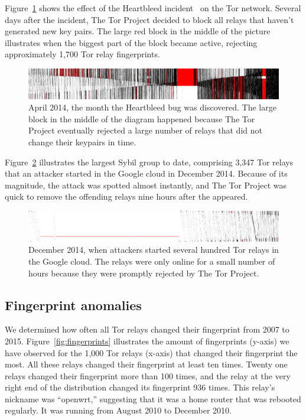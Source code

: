 Figure~\ref{fig:2014-04-heartbleed} shows the effect of the Heartbleed
incident~\cite{Durumeric2014a} on the Tor network.  Several days after the
incident, The Tor Project decided to block all relays that haven't generated new
key pairs.  The large red block in the middle of the picture illustrates when
the biggest part of the block became active, rejecting approximately 1,700 Tor
relay fingerprints.

\begin{figure}[t]
	\centering
	\includegraphics[width=\linewidth]{diagrams/heartbleed-uptimes.jpg}
	\caption{April 2014, the month the Heartbleed bug was discovered.
		The large block in the middle of the diagram happened because The
		Tor Project eventually rejected a large number of relays that did not
		change their keypairs in time.}
		\label{fig:2014-04-heartbleed}
\end{figure}

Figure~\ref{fig:2014-12-lizard} illustrates the largest Sybil group to date,
comprising 3,347 Tor relays that an attacker started in the Google cloud in
December 2014.  Because of its magnitude, the attack was spotted almost
instantly, and The Tor Project was quick to remove the offending relays nine
hours after the appeared.

\begin{figure}[t]
	\centering
	\includegraphics[width=\linewidth]{diagrams/lizard-uptimes.jpg}
	\caption{December 2014, when attackers started several hundred Tor
	relays in the Google cloud.  The relays were only online for a small number
	of hours because they were promptly rejected by The Tor Project.}
	\label{fig:2014-12-lizard}
\end{figure}

\subsection{Fingerprint anomalies}
\label{sec:fingerprint-anomalies}
We determined how often all Tor relays changed their fingerprint from 2007 to
2015.  Figure~\ref{fig:fingerprints} illustrates the amount of fingerprints
(y-axis) we have observed for the 1,000 Tor relays (x-axis) that changed their
fingerprint the most.  All these relays changed their fingerprint at least ten
times.  Twenty one relays changed their fingerprint more than 100 times, and the
relay at the very right end of the distribution changed its fingerprint 936
times.  This relay's nickname was ``openwrt,'' suggesting that it was a home
router that was rebooted regularly.  It was running from August 2010 to December
2010.

